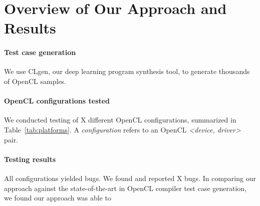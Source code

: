 \section{Overview of Our Approach and Results}\label{sec:overview}

\paragraph{Test case generation} We use CLgen, our deep learning program synthesis tool, to generate thousands of OpenCL samples.

\paragraph{OpenCL configurations tested} We conducted testing of X different OpenCL configurations, summarized in Table~\ref{tab:platforms}. A \emph{configuration} refers to an OpenCL \emph{<device, driver>} pair.



\paragraph{Testing results} All configurations yielded bugs. We found and reported X bugs. In comparing our approach against the state-of-the-art in OpenCL compiler test case generation, we found our approach was able to \cc{\ldots}